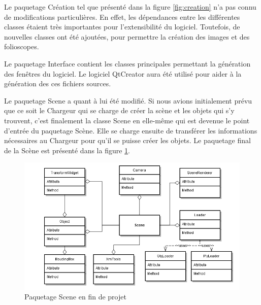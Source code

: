 Le paquetage Création tel que présenté dans la figure \ref{fig:creation} n'a pas connu de modifications particulières. En effet, les dépendances entre les différentes classes étaient très importantes pour l'extensibilité du logiciel. Toutefois, de nouvelles classes ont été ajoutées, pour permettre la création des images et des folioscopes.



Le paquetage Interface contient les classes principales permettant la génération des fenêtres du logiciel. Le logiciel QtCreator aura été utilisé pour aider à la génération des ces fichiers sources.

Le paquetage Scene a quant à lui été modifié. Si nous avions initialement prévu que ce soit le Chargeur qui se charge de créer la scène et les objets qui s'y trouvent, c'est finalement la classe Scene en elle-même qui est devenue le point d'entrée du paquetage Scène. Elle se charge ensuite de transférer les informations nécessaires au Chargeur pour qu'il se puisse créer les objets. Le paquetage final de la Scène est présenté dans la figure \ref{fig:scene}.

\begin{figure}[h]
		\centering
                \includegraphics[scale=0.5]{f_scene.png}
		\caption{\label{fig:scene} Paquetage Scene en fin de projet \protect \footnotemark}
\end{figure}
